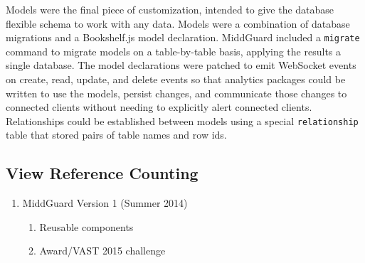 Models were the final piece of customization, intended to give the database
flexible schema to work with any data. Models were a combination of database
migrations and a Bookshelf.js \cite{bookshelf} model declaration. MiddGuard
included a \texttt{migrate} command to migrate models on a table-by-table basis,
applying the results a single database. The model declarations were patched to
emit WebSocket events on create, read, update, and delete events so that
analytics packages could be written to use the models, persist changes, and
communicate those changes to connected clients without needing to explicitly
alert connected clients. Relationships could be established between models using
a special \texttt{relationship} table that stored pairs of table names and row
ids.

\subsection{View Reference Counting}

\begin{enumerate}
  \item MiddGuard Version 1 (Summer 2014)
  \begin{enumerate}
    \item Reusable components
    \item Award/VAST 2015 challenge
  \end{enumerate}
\end{enumerate}
